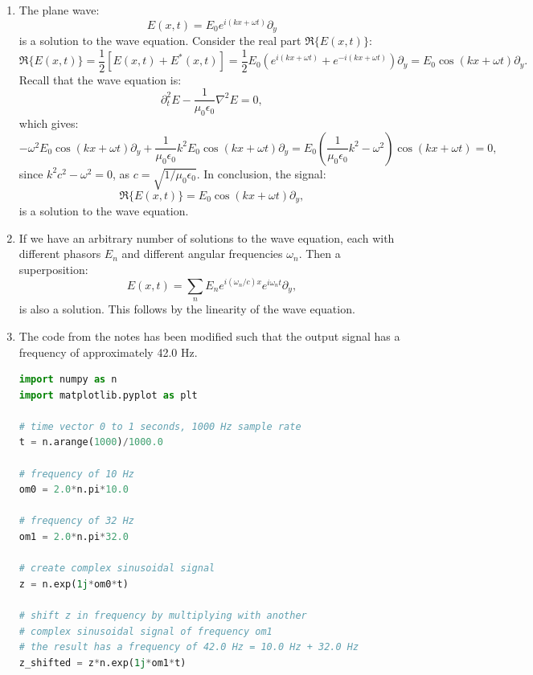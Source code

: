 \begin{enumerate}
\item The plane wave:
$$E(x,t)=E_{0}e^{i(kx+\omega t)}\partial_{y}$$
is a solution to the wave equation. Consider the real part $\Re\{E(x,t)\}$:
$$\Re\{E(x,t)\}=\frac{1}{2}[E(x,t)+E^{*}(x,t)]=\frac{1}{2}E_{0}(e^{i(kx+\omega t)}+e^{-i(kx+\omega t)})\partial_{y}=E_{0}\cos(kx+\omega t)\partial_{y}.$$
Recall that the wave equation is:
$$\partial_{t}^{2}E-\frac{1}{\mu_{0}\epsilon_{0}}\nabla^{2}E=0,$$
which gives:
$$-\omega^{2}E_{0}\cos(kx+\omega t)\partial_{y}+\frac{1}{\mu_{0}\epsilon_{0}}k^{2}E_{0}\cos(kx+\omega t)\partial_{y}=E_{0}\left(\frac{1}{\mu_{0}\epsilon_{0}}k^{2}-\omega^{2}\right)\cos(kx+\omega t)=0,$$
since $k^{2}c^{2}-\omega^{2}=0$, as $c=\sqrt{1/\mu_0\epsilon_0}$. In conclusion, the signal:
$$\Re\{E(x,t)\}=E_{0}\cos(kx+\omega t)\partial_{y},$$
is a solution to the wave equation. 

\item If we have an arbitrary number of solutions to the wave equation, each with different 
phasors $E_{n}$ and different angular frequencies $\omega_{n}$. Then a superposition:
$$E(x,t)=\sum_{n}E_{n}e^{i(\omega_{n}/c)x}e^{i\omega_{n}t}\partial_{y},$$
is also a solution. This follows by the linearity of the wave equation. 

\item The code from the notes has been modified such that the output signal has a frequency of approximately 42.0 Hz. 
\begin{lstlisting}[language=Python, caption=Adding frequencies,label=sig42]
import numpy as n
import matplotlib.pyplot as plt

# time vector 0 to 1 seconds, 1000 Hz sample rate
t = n.arange(1000)/1000.0

# frequency of 10 Hz
om0 = 2.0*n.pi*10.0

# frequency of 32 Hz
om1 = 2.0*n.pi*32.0

# create complex sinusoidal signal
z = n.exp(1j*om0*t)

# shift z in frequency by multiplying with another 
# complex sinusoidal signal of frequency om1
# the result has a frequency of 42.0 Hz = 10.0 Hz + 32.0 Hz
z_shifted = z*n.exp(1j*om1*t)


\end{lstlisting}
\end{enumerate}
